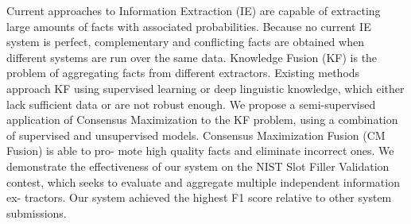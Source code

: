 Current approaches to Information Extraction (IE) are capable of extracting large amounts of facts with associated probabilities. Because no current IE system is perfect, complementary and conflicting facts are obtained when different systems are run over the same data. Knowledge Fusion (KF) is the problem of aggregating facts from different extractors. Existing methods approach KF using supervised learning or deep linguistic knowledge, which either lack sufficient data or are not robust enough. We propose a semi-supervised application of Consensus Maximization to the KF problem, using a combination of supervised and unsupervised models. Consensus Maximization Fusion (CM Fusion) is able to pro- mote high quality facts and eliminate incorrect ones. We demonstrate the effectiveness of our system on the NIST Slot Filler Validation contest, which seeks to evaluate and aggregate multiple independent information ex- tractors. Our system achieved the highest F1 score relative to other system submissions.
